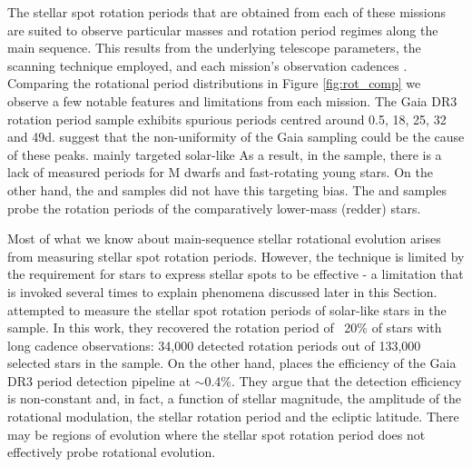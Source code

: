 The stellar spot rotation periods that are obtained from each of these missions are suited to observe particular masses and rotation period regimes along the main sequence.
This results from the underlying telescope parameters, the scanning technique employed, and each mission's observation cadences \citep{distefano_determination_2012}.
Comparing the rotational period distributions in Figure \ref{fig:rot_comp} we observe a few notable features and limitations from each mission.
The Gaia DR3 rotation period sample exhibits spurious periods centred around 0.5, 18, 25, 32 and 49d.
\citet{distefano_gaia_2022} suggest that the non-uniformity of the Gaia sampling could be the cause of these peaks.
\kepler{} mainly targeted solar-like 
As a result, in the \kepler{} sample, there is a lack of measured periods for M dwarfs and fast-rotating young stars.
On the other hand, the \ZTF{} and \gaia{} samples did not have this targeting bias.
The \ZTF{} and \gaia{} samples probe the rotation periods of the comparatively lower-mass (redder) stars.


Most of what we know about main-sequence stellar rotational evolution arises from measuring stellar spot rotation periods.
However, the technique is limited by the requirement for stars to express stellar spots to be effective - a limitation that is invoked several times to explain phenomena discussed later in this Section. 
\citet{mcquillan_rotation_2014} attempted to measure the stellar spot rotation periods of solar-like stars in the \kepler{} sample.
In this work, they recovered the rotation period of ~20\% of stars with long cadence observations: 34,000 detected rotation periods out of 133,000 selected stars in the sample.
On the other hand, \citet{distefano_gaia_2022} places the efficiency of the Gaia DR3 period detection pipeline at $\sim$0.4\%.
They argue that the detection efficiency is non-constant and, in fact, a function of stellar magnitude, the amplitude of the rotational modulation, the stellar rotation period and the ecliptic latitude.
There may be regions of evolution where the stellar spot rotation period does not effectively probe rotational evolution.


